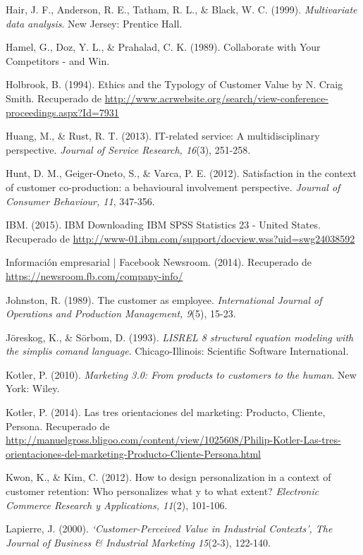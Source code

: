 \begin{thebibliography}{11}
	\bibitem{}
		Hair, J. F., Anderson, R. E., Tatham, R. L., \& Black, W. C. (1999). \emph{Multivariate data analysis}. New Jersey: Prentice Hall.

	\bibitem{}
		Hamel, G., Doz, Y. L., \& Prahalad, C. K. (1989). Collaborate with Your Competitors - and Win. 

	\bibitem{}
		Holbrook, B. (1994). Ethics and the Typology of Customer Value by N. Craig Smith. Recuperado de \url{http://www.acrwebsite.org/search/view-conference-proceedings.aspx?Id=7931}

	\bibitem{}
		Huang, M., \& Rust, R. T. (2013). IT-related service: A multidisciplinary perspective. \emph{Journal of Service Research, 16}(3), 251-258.

	\bibitem{}
		Hunt, D. M., Geiger-Oneto, S., \& Varca, P. E. (2012). Satisfaction in the context of customer co-production: a behavioural involvement perspective. \emph{Journal of Consumer Behaviour, 11}, 347-356.

	\bibitem{}
		IBM. (2015). IBM Downloading IBM SPSS Statistics 23 - United States.  Recuperado de \url{http://www-01.ibm.com/support/docview.wss?uid=swg24038592}

	\bibitem{}
		Información empresarial | Facebook Newsroom. (2014). Recuperado de \url{https://newsroom.fb.com/company-info/}

	\bibitem{}
		Johnston, R. (1989). The customer as employee.  \emph{International Journal of Operations and Production Management, 9}(5), 15-23.  

	\bibitem{}
		Jöreskog, K., \& Sörbom, D. (1993).  \emph{LISREL 8 structural equation modeling with the simplis comand language}. Chicago-Illinois: Scientific Software International.

	\bibitem{}
		Kotler, P. (2010). \emph{Marketing 3.0: From products to customers to the human}. New York: Wiley.

	\bibitem{}
		Kotler, P. (2014). Las tres orientaciones del marketing: Producto, Cliente, Persona.  Recuperado de \url{http://manuelgross.bligoo.com/content/view/1025608/Philip-Kotler-Las-tres-orientaciones-del-marketing-Producto-Cliente-Persona.html}

	\bibitem{}
		Kwon, K., \& Kim, C. (2012). How to design personalization in a context of customer retention: Who personalizes what y to what extent? \emph{Electronic Commerce Research y Applications, 11}(2), 101-106.

	\bibitem{}
		Lapierre, J. (2000). \emph{‘Customer-Perceived Value in Industrial Contexts’, The Journal of Business \& Industrial Marketing 15}(2-3), 122-140.


\end{thebibliography}

